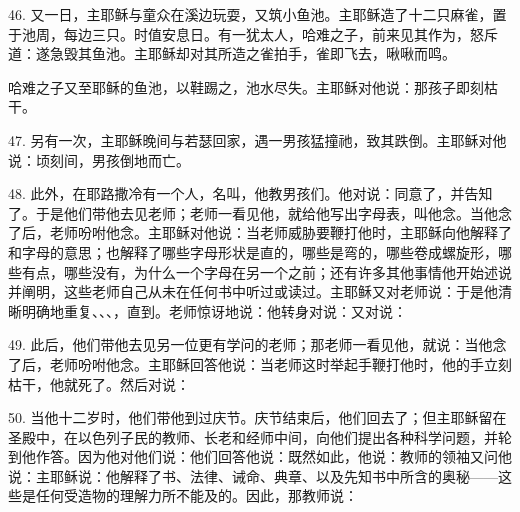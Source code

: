 46. 又一日，主耶稣与童众在溪边玩耍，又筑小鱼池。主耶稣造了十二只麻雀，置于池周，每边三只。时值安息日。有一犹太人，哈难之子，前来见其作为，怒斥道：遂急毁其鱼池。主耶稣却对其所造之雀拍手，雀即飞去，啾啾而鸣。\par

哈难之子又至耶稣的鱼池，以鞋踢之，池水尽失。主耶稣对他说：那孩子即刻枯干。\par

47. 另有一次，主耶稣晚间与若瑟回家，遇一男孩猛撞祂，致其跌倒。主耶稣对他说：顷刻间，男孩倒地而亡。\par

48. 此外，在耶路撒冷有一个人，名叫，他教男孩们。他对说：同意了，并告知了。于是他们带他去见老师；老师一看见他，就给他写出字母表，叫他念。当他念了后，老师吩咐他念。主耶稣对他说：当老师威胁要鞭打他时，主耶稣向他解释了和字母的意思；也解释了哪些字母形状是直的，哪些是弯的，哪些卷成螺旋形，哪些有点，哪些没有，为什么一个字母在另一个之前；还有许多其他事情他开始述说并阐明，这些老师自己从未在任何书中听过或读过。主耶稣又对老师说：于是他清晰明确地重复、、、，直到。老师惊讶地说：他转身对说：又对说：\par

49. 此后，他们带他去见另一位更有学问的老师；那老师一看见他，就说：当他念了后，老师吩咐他念。主耶稣回答他说：当老师这时举起手鞭打他时，他的手立刻枯干，他就死了。然后对说：\par

50. 当他十二岁时，他们带他到过庆节。庆节结束后，他们回去了；但主耶稣留在圣殿中，在以色列子民的教师、长老和经师中间，向他们提出各种科学问题，并轮到他作答。因为他对他们说：他们回答他说：既然如此，他说：教师的领袖又问他说：主耶稣说：他解释了书、法律、诫命、典章、以及先知书中所含的奥秘——这些是任何受造物的理解力所不能及的。因此，那教师说：\par

